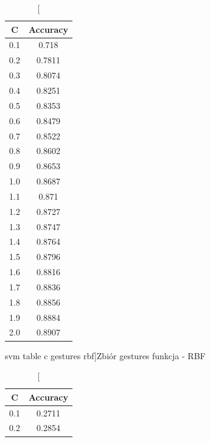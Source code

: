 \documentclass{classrep}
\begin{document}
{{\begin{table}[!htbp]
\begin{minipage}{.3\textwidth}
\begin{tabular}{|c|c|}
                        \hline
                        C & Accuracy \\ \hline
                        0.1 & 0.718 \\ \hline
                        0.2 & 0.7811 \\ \hline
                        0.3 & 0.8074 \\ \hline
                        0.4 & 0.8251 \\ \hline
                        0.5 & 0.8353 \\ \hline
                        0.6 & 0.8479 \\ \hline
                        0.7 & 0.8522 \\ \hline
                        0.8 & 0.8602 \\ \hline
                        0.9 & 0.8653 \\ \hline
                        1.0 & 0.8687 \\ \hline
                        1.1 & 0.871 \\ \hline
                        1.2 & 0.8727 \\ \hline
                        1.3 & 0.8747 \\ \hline
                        1.4 & 0.8764 \\ \hline
                        1.5 & 0.8796 \\ \hline
                        1.6 & 0.8816 \\ \hline
                        1.7 & 0.8836 \\ \hline
                        1.8 & 0.8856 \\ \hline
                        1.9 & 0.8884 \\ \hline
                        2.0 & 0.8907 \\ \hline
                    \end{tabular}
                    \caption
                    [svm table c gestures rbf]{Zbiór gestures funkcja - RBF}
                    \label{{svm_table_c_gestures_rbf}}
                \end{minipage}
                \hfill
                \begin{minipage}{.3\textwidth}
                    \centering
                    \begin{tabular}{|c|c|}
                        \hline
                        C & Accuracy \\ \hline
                        0.1 & 0.2711 \\ \hline
                        0.2 & 0.2854 \\ \hline

\end{tabular}
\end{minipage}
\end{table}}}
\end{document}
